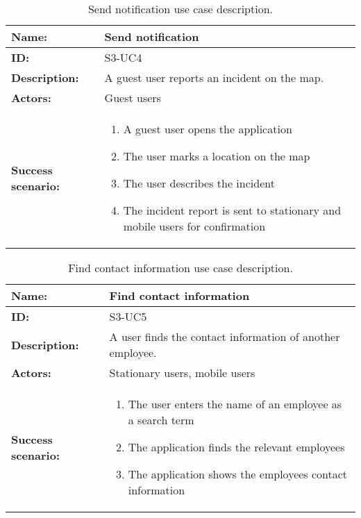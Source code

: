 \begin{table}[h!]
    \centering
    \begin{tabularx}{\textwidth}{|l|X|}
        \hline
        \textbf{Name:}  & Send notification \\ \hline
        \textbf{ID:}    & S3-UC4 \\ \hline
        \textbf{Description:} & A guest user reports an incident on the map. \\ \hline
        \textbf{Actors:} & Guest users \\ \hline
        \textbf{Success scenario:} & 
        \begin{enumerate}
            \item A guest user opens the application
            \item The user marks a location on the map
            \item The user describes the incident
            \item The incident report is sent to stationary and mobile users for confirmation
        \end{enumerate}
        \\ \hline
    \end{tabularx}
    \caption{Send notification use case description.}
    \label{tab:s3-uc4}
\end{table}

\begin{table}[h!]
    \centering
    \begin{tabularx}{\textwidth}{|l|X|}
        \hline
        \textbf{Name:}  & Find contact information \\ \hline
        \textbf{ID:}    & S3-UC5 \\ \hline
        \textbf{Description:} & A user finds the contact information of another employee. \\ \hline
        \textbf{Actors:} & Stationary users, mobile users \\ \hline
        \textbf{Success scenario:} & 
        \begin{enumerate}
            \item The user enters the name of an employee as a search term
            \item The application finds the relevant employees
            \item The application shows the employees contact information
        \end{enumerate}
        \\ \hline
    \end{tabularx}
    \caption{Find contact information use case description.}
    \label{tab:s3-uc5}
\end{table}

